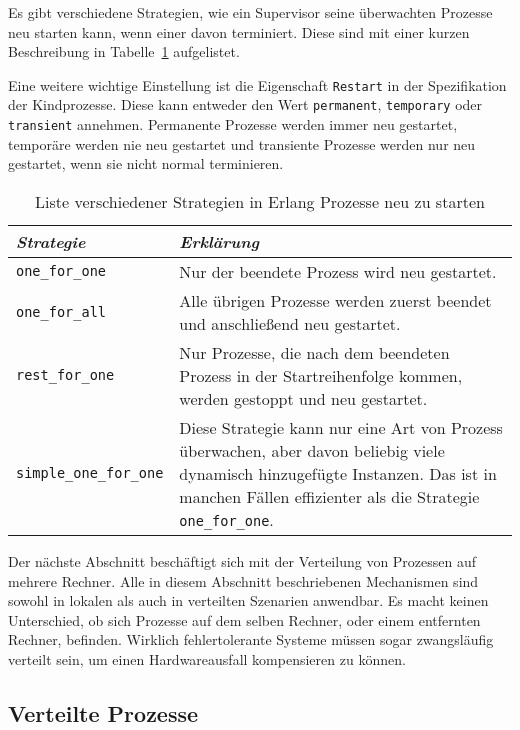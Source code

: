 Es gibt verschiedene Strategien, wie ein Supervisor seine überwachten Prozesse neu starten kann, wenn einer davon terminiert. Diese sind mit einer kurzen Beschreibung in Tabelle~\ref{tab:erlang-restart-strategy} aufgelistet.

Eine weitere wichtige Einstellung ist die Eigenschaft \lstinline{Restart} in der Spezifikation der Kindprozesse. Diese kann entweder den Wert \lstinline{permanent}, \lstinline{temporary} oder \lstinline{transient} annehmen. Permanente Prozesse werden immer neu gestartet, temporäre werden nie neu gestartet und transiente Prozesse werden nur neu gestartet, wenn sie nicht normal terminieren.

\begin{table}[!hbt]
\caption{Liste verschiedener Strategien in Erlang Prozesse neu zu starten}
\label{tab:erlang-restart-strategy}
\centering
\begin{tabular}{|l|p{8cm}|}
\hline
\emph{Strategie} & \emph{Erklärung} \\
\hline
\lstinline$one_for_one$ & Nur der beendete Prozess wird neu gestartet. \\
\hline
\lstinline$one_for_all$ & Alle übrigen Prozesse werden zuerst beendet und anschließend neu gestartet. \\
\hline
\lstinline$rest_for_one$ & Nur Prozesse, die nach dem beendeten Prozess in der Startreihenfolge kommen, werden gestoppt und neu gestartet. \\
\hline
\lstinline$simple_one_for_one$ & Diese Strategie kann nur eine Art von Prozess überwachen, aber davon beliebig viele dynamisch hinzugefügte Instanzen. Das ist in manchen Fällen effizienter als die Strategie \lstinline$one_for_one$. \\
\hline
\end{tabular}
\end{table}

Der nächste Abschnitt beschäftigt sich mit der Verteilung von Prozessen auf mehrere Rechner. Alle in diesem Abschnitt beschriebenen Mechanismen sind sowohl in lokalen als auch in verteilten Szenarien anwendbar. Es macht keinen Unterschied, ob sich Prozesse auf dem selben Rechner, oder einem entfernten Rechner, befinden. Wirklich fehlertolerante Systeme müssen sogar zwangsläufig verteilt sein, um einen Hardwareausfall kompensieren zu können.

\subsection{Verteilte Prozesse}


